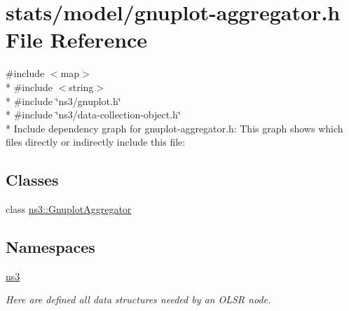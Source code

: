 \hypertarget{gnuplot-aggregator_8h}{}\section{stats/model/gnuplot-\/aggregator.h File Reference}
\label{gnuplot-aggregator_8h}
{\ttfamily \#include $<$map$>$}\\*
{\ttfamily \#include $<$string$>$}\\*
{\ttfamily \#include \char`\"{}ns3/gnuplot.\+h\char`\"{}}\\*
{\ttfamily \#include \char`\"{}ns3/data-\/collection-\/object.\+h\char`\"{}}\\*
Include dependency graph for gnuplot-\/aggregator.h\+:
This graph shows which files directly or indirectly include this file\+:
\subsection*{Classes}
\begin{DoxyCompactItemize}
\item 
class \hyperlink{classns3_1_1GnuplotAggregator}{ns3\+::\+Gnuplot\+Aggregator}
\end{DoxyCompactItemize}
\subsection*{Namespaces}
\begin{DoxyCompactItemize}
\item 
 \hyperlink{namespacens3}{ns3}
\begin{DoxyCompactList}\small\item\em Here are defined all data structures needed by an O\+L\+SR node. \end{DoxyCompactList}\end{DoxyCompactItemize}
